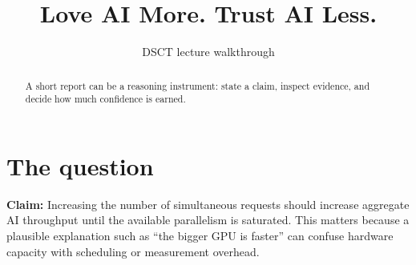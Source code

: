 \documentclass{article}\usepackage[margin=1in]{geometry}\usepackage{xcolor}\usepackage{hyperref}
\title{Love AI More. Trust AI Less.}\author{DSCT lecture walkthrough}\date{}
\begin{document}
\maketitle
\begin{abstract}A short report can be a reasoning instrument: state a claim, inspect evidence, and decide how much confidence is earned.\end{abstract}
\section{The question}
\textbf{Claim:} Increasing the number of simultaneous requests should increase aggregate AI throughput until the available parallelism is saturated. This matters because a plausible explanation such as “the bigger GPU is faster” can confuse hardware capacity with scheduling or measurement overhead.
\end{document}
